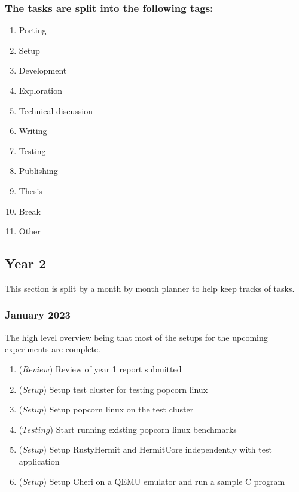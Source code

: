\subsubsection{The tasks are split into the following tags:}
\begin{enumerate}
  \item Porting 
  \item Setup
  \item Development
  \item Exploration 
  \item Technical discussion 
  \item Writing
  \item Testing
  \item Publishing
  \item Thesis
  \item Break
  \item Other
\end{enumerate}


\subsection{Year 2}
This section is split by a month by month planner to help keep tracks of tasks. 

\subsubsection{January 2023}
The high level overview being that most of the setups for the upcoming experiments
are complete. 
\begin{enumerate}
    \item (\(Review\)) Review of year 1 report submitted 
    \item (\(Setup\)) Setup test cluster for testing popcorn linux 
    \item (\(Setup\)) Setup popcorn linux on the test cluster
    \item (\(Testing\)) Start running existing popcorn linux benchmarks 
    \item (\(Setup\)) Setup RustyHermit and HermitCore independently with test application 
    \item (\(Setup\)) Setup Cheri on a QEMU emulator and run a sample C program 
  \end{enumerate} 


